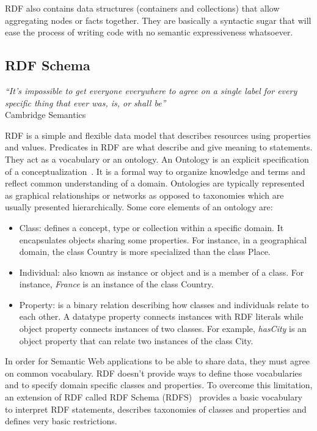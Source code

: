 RDF also contains data structures (containers and collections) that allow aggregating nodes or facts together. They are basically a syntactic sugar that will ease the process of writing code with no semantic expressiveness whatsoever.

\subsection{RDF Schema}

\begin{flushright}
\textit{``It's impossible to get everyone everywhere to agree on a single label for every specific thing that ever was, is, or shall be''}\\
Cambridge Semantics~\cite{Cambridge:RDF-101:13}
\end{flushright}

RDF is a simple and flexible data model that describes resources using properties and values. Predicates in RDF are what describe and give meaning to statements. They act as a vocabulary or an ontology. An Ontology is an explicit specification of a conceptualization~\cite{Gruber:KA:93}. It is a formal way to organize knowledge and terms and reflect common understanding of a domain. Ontologies are typically represented as graphical relationships or networks as opposed to taxonomies which are usually presented hierarchically. Some core elements of an ontology are:

\begin{itemize}
	\item Class: defines a concept, type or collection within a specific domain. It encapsulates objects sharing some properties. For instance, in a geographical domain, the class Country is more specialized than the class Place.
	\item Individual: also known as instance or object and is a member of a class. For instance, \emph{France} is an instance of the class Country.
	\item Property: is a binary relation describing how classes and individuals relate to each other. A datatype property connects instances with RDF literals while object property connects instances of two classes. For example, \emph{hasCity} is an object property that can relate two instances of the class City.
\end{itemize}

In order for Semantic Web applications to be able to share data, they must agree on common vocabulary. RDF doesn't provide ways to define those vocabularies and to specify domain specific classes and properties. To overcome this limitation, an extension of RDF called RDF Schema (RDFS)~\cite{Brickley:RDFS:14} provides a basic vocabulary to interpret RDF statements, describes taxonomies of classes and properties and defines very basic restrictions.

